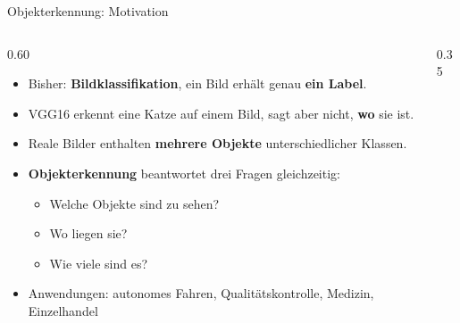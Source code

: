 
\begin{frame}{Objekterkennung: Motivation}
\begin{columns}
\begin{column}{0.60\textwidth}
\begin{itemize}
  \item Bisher: \textbf{Bildklassifikation}, ein Bild erhält genau \textbf{ein Label}.
  \item VGG16 erkennt eine Katze auf einem Bild, sagt aber nicht, \textbf{wo} sie ist.
  \item Reale Bilder enthalten \textbf{mehrere Objekte} unterschiedlicher Klassen.
  \item \textbf{Objekterkennung} beantwortet drei Fragen gleichzeitig:
  \begin{itemize}
    \item Welche Objekte sind zu sehen?
    \item Wo liegen sie?
    \item Wie viele sind es?
  \end{itemize}
  \item Anwendungen: autonomes Fahren, Qualitätskontrolle, Medizin, Einzelhandel
\end{itemize}
\end{column}
\begin{column}{0.35\textwidth}
\centering
{}
\end{column}
\end{columns}
\end{frame}

